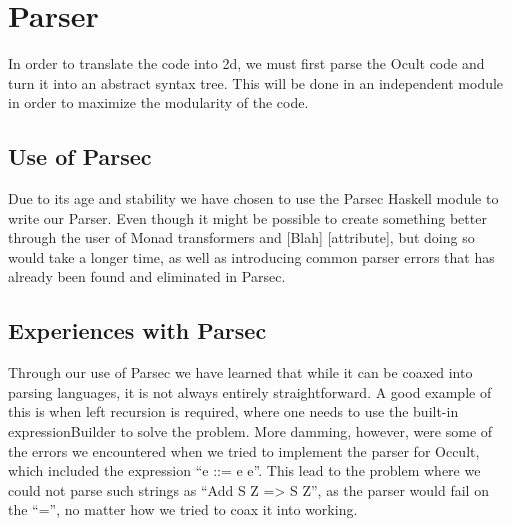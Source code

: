 \section{Parser}
In order to translate the code into 2d, we must first parse the Ocult code and turn it into an abstract syntax tree. This will be done in an independent module in order to maximize the modularity of the code.

\subsection{Use of Parsec}
Due to its age and stability we have chosen to use the Parsec Haskell module to write our Parser. Even though it might be possible to create something better through the user of Monad transformers and [Blah] [attribute], but doing so would take a longer time, as well as introducing common parser errors that has already been found and eliminated in Parsec.

\subsection{Experiences with Parsec}
Through our use of Parsec we have learned that while it can be coaxed into parsing languages, it is not always entirely straightforward. A good example of this is when left recursion is required, where one needs to use the built-in expressionBuilder to solve the problem. More damming, however, were some of the errors we encountered when we tried to implement the parser for Occult, which included the expression ``e ::= e e''. This lead to the problem where we could not parse such strings as ``Add S Z => S Z'', as the parser would fail on the ``='', no matter how we tried to coax it into working.
